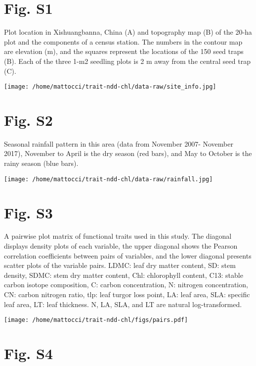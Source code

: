 \documentclass[
  12pt,
  letterpaper,
  DIV=11,
  numbers=noendperiod]{scrartcl}
\begin{document}
\newpage

\hypertarget{fig.-s1}{%
\section{Fig. S1}\label{fig.-s1}}

Plot location in Xishuangbanna, China (A) and topography map (B) of the
20-ha plot and the components of a census station. The numbers in the
contour map are elevation (m), and the squares represent the locations
of the 150 seed traps (B). Each of the three 1-m2 seedling plots is 2 m
away from the central seed trap (C).

\texttt{[image: /home/mattocci/trait-ndd-chl/data-raw/site\_info.jpg]}

\newpage

\hypertarget{fig.-s2}{%
\section{Fig. S2}\label{fig.-s2}}

Seasonal rainfall pattern in this area (data from November 2007-
November 2017), November to April is the dry season (red bars), and May
to October is the rainy season (blue bars).

\texttt{[image: /home/mattocci/trait-ndd-chl/data-raw/rainfall.jpg]}

\newpage

\hypertarget{fig.-s3}{%
\section{Fig. S3}\label{fig.-s3}}

A pairwise plot matrix of functional traits used in this study. The
diagonal displays density plots of each variable, the upper diagonal
shows the Pearson correlation coefficients between pairs of variables,
and the lower diagonal presents scatter plots of the variable pairs.
LDMC: leaf dry matter content, SD: stem density, SDMC: stem dry matter
content, Chl: chlorophyll content, C13: stable carbon isotope
composition, C: carbon concentration, N: nitrogen concentration, CN:
carbon nitrogen ratio, tlp: leaf turgor loss point, LA: leaf area, SLA:
specific leaf area, LT: leaf thickness. N, LA, SLA, and LT are natural
log-transformed.

\texttt{[image: /home/mattocci/trait-ndd-chl/figs/pairs.pdf]}

\newpage

\hypertarget{fig.-s4}{%
\section{Fig. S4}\label{fig.-s4}}
\end{document}

